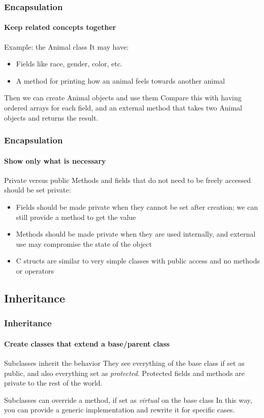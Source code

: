 \begin{frame}
\frametitle{Encapsulation}
\framesubtitle{Keep related concepts together}

\begin{block}{Example: the Animal class}
It may have:
\begin{itemize}
\item Fields like race, gender, color, etc.
\item A method for printing how an animal feels towards another animal
\end{itemize}
\end{block}
\pause
\begin{block}{Then we can create Animal objects and use them}
Compare this with having ordered arrays for each field, and an external method that takes two Animal objects and returns the result.
\end{block}

\end{frame}

\begin{frame}
\frametitle{Encapsulation}
\framesubtitle{Show only what is necessary}

\begin{block}{Private versus public}
Methods and fields that do not need to be freely accessed should be set private:
\begin{itemize}
\item Fields should be made private when they cannot be set after creation; we can still provide a method to get the value
\item Methods should be made private when they are used internally, and external use may compromise the state of the object
\end{itemize}
\end{block}
\pause
\begin{itemize}
\item C structs are similar to very simple classes with public access and no methods or operators
\end{itemize}

\end{frame}

\subsection{Inheritance}

\begin{frame}
\frametitle{Inheritance}
\framesubtitle{Create classes that extend a base/parent class}

\begin{block}{Subclasses inherit the behavior}
They see everything of the base class if set as public, and also everything set as {\em protected}. Protected fields and methods are private to the rest of the world.
\end{block}
\pause
\begin{block}{Subclasses can override a method, if set as {\em virtual} on the base class}
In this way, you can provide a generic implementation and rewrite it for specific cases.
\end{block}
\end{frame}

